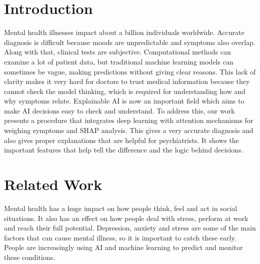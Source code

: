 \documentclass[conference]{IEEEtran}
\begin{document}
\section{Introduction}

Mental health illnesses impact about a billion individuals worldwide. Accurate diagnosis is difficult because moods are unpredictable and symptoms also overlap. Along with that, clinical tests are subjective. Computational methods can examine a lot of patient data, but traditional machine learning models can sometimes be vague, making predictions without giving clear reasons. This lack of clarity makes it very hard for doctors to trust medical information because they cannot check the model thinking, which is required for understanding how and why symptoms relate. Explainable AI is now an important field which aims to make AI decisions easy to check and understand. To address this, our work presents a procedure that integrates deep learning with attention mechanisms for weighing symptoms and SHAP analysis. This gives a very accurate diagnosis and also gives proper explanations that are helpful for psychiatrists. It shows the important features that help tell the difference and the logic behind decisions.

\section{Related Work}

Mental health has a huge impact on how people think, feel and act in social situations. It also has an effect on how people deal with stress, perform at work and reach their full potential. Depression, anxiety and stress are some of the main factors that can cause mental illness, so it is important to catch these early. People are increasingly using AI and machine learning to predict and monitor these conditions.
\end{document}
